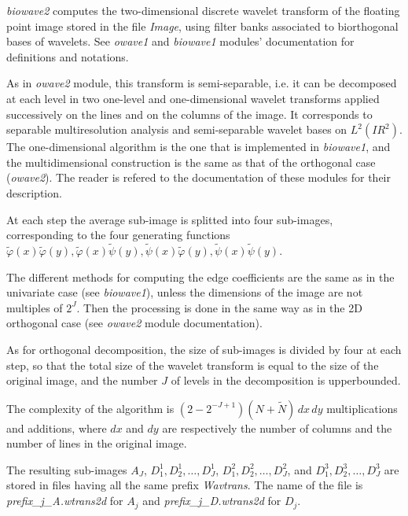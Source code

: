 \parindent 0.6cm 
\parskip 0.4cm

\def\real{I\!\!R}

{\em biowave2} computes the two-dimensional discrete wavelet transform 
of the floating point image stored in the file {\em Image}, 
using filter banks associated to biorthogonal bases of wavelets. 
See {\em owave1} and {\em biowave1} modules' documentation for definitions 
and notations.

As in {\em owave2} module, this transform is semi-separable, i.e. it can be 
decomposed at each level in two one-level and one-dimensional wavelet 
transforms applied successively on the lines and on the columns of the image. 
It corresponds to separable multiresolution analysis and semi-separable 
wavelet bases on \( L^{2}(\real^{2}) \).
The one-dimensional algorithm is the one that is implemented in 
{\em biowave1}, and the multidimensional construction is the same 
as that of the orthogonal case ({\em owave2}). The reader is refered 
to the documentation of these modules for their description.  

At each step the average sub-image is splitted into four sub-images, 
corresponding to the four generating functions 
$\tilde{\varphi}(x) \tilde{\varphi}(y), \tilde{\varphi}(x) \tilde{\psi}(y), 
\tilde{\psi}(x) \tilde{\varphi}(y), \tilde{\psi}(x) \tilde{\psi}(y)$. 

The different methods for computing the edge coefficients are the same as 
in the univariate case (see {\em biowave1}), unless the dimensions of the 
image are not multiples of $2^J$. Then the processing is done in the same 
way as in the 2D orthogonal case (see {\em owave2} module documentation). 

As for orthogonal decomposition, the size of sub-images is divided by four 
at each step, so that the total size of the wavelet transform is equal 
to the size of the original image, and the number $J$ of levels 
in the decomposition is upperbounded.

The complexity of the algorithm is $(2-2^{-J+1}) (N+\tilde{N}) \, dx\, dy$ 
multiplications and additions, where $dx$ and $dy$ are respectively 
the number of columns and the number of lines in the original image. 

The resulting sub-images  $A_{J}$, \( D^{1}_{1}, D^{1}_{2}, \ldots, D^{1}_{J} \), \( D^{2}_{1}, D^{2}_{2}, \ldots, D^{2}_{J} \), and \( D^{3}_{1}, D^{3}_{2}, \ldots, D^{3}_{J} \) are stored in files having all the same prefix {\em Wavtrans}. The name of the file is {\em prefix\_j\_A.wtrans2d} for \( A_{j} \) and {\em prefix\_j\_D.wtrans2d} for \( D_{j} \).

